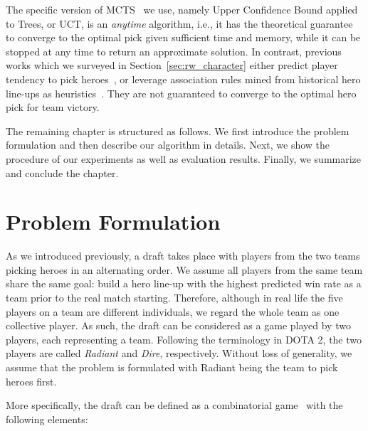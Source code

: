 The specific version of MCTS~\cite{kocsis2006bandit} we use, namely Upper Confidence Bound applied to Trees, or UCT, is an \textit{anytime} algorithm, i.e., it has the theoretical guarantee to converge to the optimal pick given sufficient time and memory, while it can be stopped at any time to return an approximate solution. In contrast, previous works which we surveyed in Section~\ref{sec:rw_character} either predict player tendency to pick heroes~\cite{summerville2017reco}, or leverage association rules mined from historical hero line-ups as heuristics~\cite{hanke2017reco}. They are not guaranteed to converge to the optimal hero pick for team victory.

The remaining chapter is structured as follows. We first introduce the problem formulation and then describe our algorithm in details. Next, we show the procedure of our experiments as well as evaluation results. Finally, we summarize and conclude the chapter.

\section{Problem Formulation}\label{sec:probdef}
As we introduced previously, a draft takes place with players from the two teams picking heroes in an alternating order. We assume all players from the same team share the same goal: build a hero line-up with the highest predicted win rate as a team prior to the real match starting. Therefore, although in real life the five players on a team are different individuals, we regard the whole team as one collective player. As such, the draft can be considered as a game played by two players, each representing a team. Following the terminology in DOTA 2, the two players are called \textit{Radiant} and \textit{Dire}, respectively. Without loss of generality, we assume that the problem is formulated with Radiant being the team to pick heroes first. 

More specifically, the draft can be defined as a combinatorial game~\cite{browne2012survey} with the following elements:


